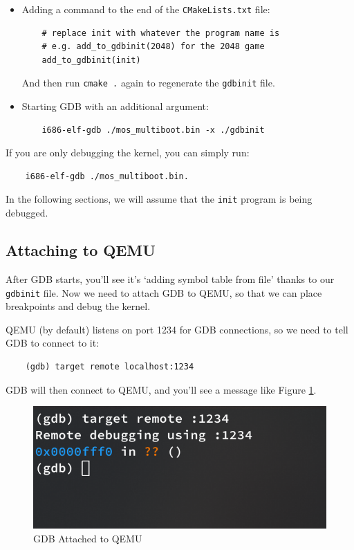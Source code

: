 \begin{itemize}
    \item Adding a command to the end of the \texttt{CMakeLists.txt} file:
          \begin{verbatim}
    # replace init with whatever the program name is
    # e.g. add_to_gdbinit(2048) for the 2048 game
    add_to_gdbinit(init)
          \end{verbatim}
          And then run \texttt{cmake .} again to regenerate the \texttt{gdbinit} file.

    \item Starting GDB with an additional argument:
          \begin{verbatim}
    i686-elf-gdb ./mos_multiboot.bin -x ./gdbinit
          \end{verbatim}
\end{itemize}

If you are only debugging the kernel, you can simply run:
\begin{verbatim}
    i686-elf-gdb ./mos_multiboot.bin.
\end{verbatim}

In the following sections, we will assume that the \texttt{init} program is being debugged.

\subsection{Attaching to QEMU} \label{sec:gdb-attach}

After GDB starts, you'll see it's `adding symbol table from file' thanks to our \texttt{gdbinit} file.
Now we need to attach GDB to QEMU, so that we can place breakpoints and debug the kernel.

QEMU (by default) listens on port 1234 for GDB connections, so we need to tell GDB to connect to it:

\begin{verbatim}
    (gdb) target remote localhost:1234
\end{verbatim}

GDB will then connect to QEMU, and you'll see a message like Figure \ref{fig:gdb-attached}.

\begin{figure}[ht]
    \centering
    \includegraphics[width=\textwidth]{assets/c1.gdb-attached.png}
    \caption{GDB Attached to QEMU}
    \label{fig:gdb-attached}
\end{figure}

